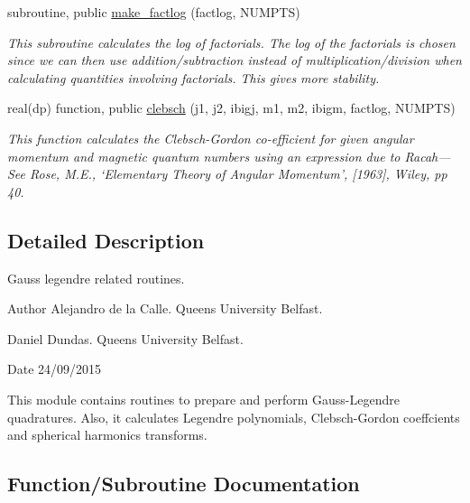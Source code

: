 \begin{DoxyCompactItemize}
subroutine, public \mbox{\hyperlink{namespacegaussleg_a684bbdd1b82f3ce27ad23bf5935c36b0}{make\+\_\+factlog}} (factlog, N\+U\+M\+P\+TS)
\begin{DoxyCompactList}\small\item\em This subroutine calculates the log of factorials. The log of the factorials is chosen since we can then use addition/subtraction instead of multiplication/division when calculating quantities involving factorials. This gives more stability. \end{DoxyCompactList}\item 
real(dp) function, public \mbox{\hyperlink{namespacegaussleg_a26bbda9b75b77851866018371f404ead}{clebsch}} (j1, j2, ibigj, m1, m2, ibigm, factlog, N\+U\+M\+P\+TS)
\begin{DoxyCompactList}\small\item\em This function calculates the Clebsch-\/\+Gordon co-\/efficient for given angular momentum and magnetic quantum numbers using an expression due to Racah---See Rose, M.\+E., `Elementary Theory of Angular Momentum', \mbox{[}1963\mbox{]}, Wiley, pp 40. \end{DoxyCompactList}\end{DoxyCompactItemize}


\subsection{Detailed Description}
Gauss legendre related routines. 

\begin{DoxyAuthor}{Author}
Alejandro de la Calle. Queen\textquotesingle{}s University Belfast. 

Daniel Dundas. Queen\textquotesingle{}s University Belfast. 
\end{DoxyAuthor}
\begin{DoxyDate}{Date}
24/09/2015
\end{DoxyDate}
This module contains routines to prepare and perform Gauss-\/\+Legendre quadratures. Also, it calculates Legendre polynomials, Clebsch-\/\+Gordon coeffcients and spherical harmonics transforms. 

\subsection{Function/\+Subroutine Documentation}
\mbox{\label{namespacegaussleg_a26bbda9b75b77851866018371f404ead}} 
